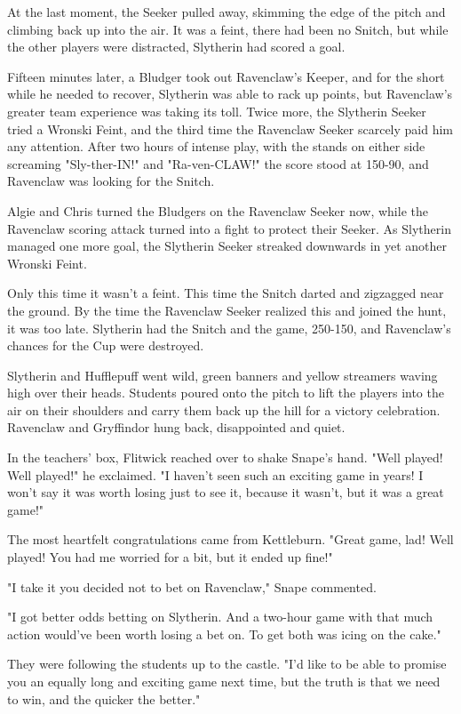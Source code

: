 At the last moment, the Seeker pulled away, skimming the edge of the pitch and climbing back up into the air. It was a feint, there had been no Snitch, but while the other players were distracted, Slytherin had scored a goal.

Fifteen minutes later, a Bludger took out Ravenclaw's Keeper, and for the short while he needed to recover, Slytherin was able to rack up points, but Ravenclaw's greater team experience was taking its toll. Twice more, the Slytherin Seeker tried a Wronski Feint, and the third time the Ravenclaw Seeker scarcely paid him any attention. After two hours of intense play, with the stands on either side screaming "Sly-ther-IN!" and "Ra-ven-CLAW!" the score stood at 150-90, and Ravenclaw was looking for the Snitch.

Algie and Chris turned the Bludgers on the Ravenclaw Seeker now, while the Ravenclaw scoring attack turned into a fight to protect their Seeker. As Slytherin managed one more goal, the Slytherin Seeker streaked downwards in yet another Wronski Feint.

Only this time it wasn't a feint. This time the Snitch darted and zigzagged near the ground. By the time the Ravenclaw Seeker realized this and joined the hunt, it was too late. Slytherin had the Snitch and the game, 250-150, and Ravenclaw's chances for the Cup were destroyed.

Slytherin and Hufflepuff went wild, green banners and yellow streamers waving high over their heads. Students poured onto the pitch to lift the players into the air on their shoulders and carry them back up the hill for a victory celebration. Ravenclaw and Gryffindor hung back, disappointed and quiet.

In the teachers' box, Flitwick reached over to shake Snape's hand. "Well played! Well played!" he exclaimed. "I haven't seen such an exciting game in years! I won't say it was worth losing just to see it, because it wasn't, but it was a great game!"

The most heartfelt congratulations came from Kettleburn. "Great game, lad! Well played! You had me worried for a bit, but it ended up fine!"

"I take it you decided not to bet on Ravenclaw," Snape commented.

"I got better odds betting on Slytherin. And a two-hour game with that much action would've been worth losing a bet on. To get both was icing on the cake."

They were following the students up to the castle. "I'd like to be able to promise you an equally long and exciting game next time, but the truth is that we need to win, and the quicker the better."

